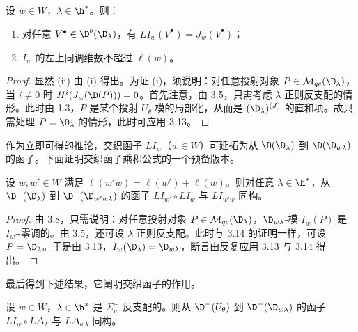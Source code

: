 \begin{theorem}\label{thm:03.3.14}
设 $w\in W$，$\lambda\in\h^*$。则：
\begin{enumerate}[label=(\roman*),leftmargin=2.2em,itemsep=0pt,topsep=2pt]
\item 对任意 $V^\bullet\in\D^b(\D_\lambda)$，有 $LI_w(V^\bullet)=J_w(V^\bullet)$；
\item $I_w$ 的左上同调维数不超过 $\ell(w)$。
\end{enumerate}
\end{theorem}

\begin{proof}
显然 (ii) 由 (i) 得出。为证 (i)，须说明：对任意投射对象 $P\in\mathcal{M}_{qc}(\D_\lambda)$，当 $i\neq0$ 时 $H^i(J_w(\D(P)))=0$。首先注意，由 3.5，只需考虑 $\lambda$ 正则反支配的情形。此时由 1.3，$P$ 是某个投射 $U_\theta$-模的局部化，从而是 $(\D_\lambda)^{(J)}$ 的直和项。故只需处理 $P=\D_\lambda$ 的情形，此时可应用 3.13。
\end{proof}

作为立即可得的推论，交织函子 $LI_w$（$w\in W$）可延拓为从 $\D(\D_\lambda)$ 到 $\D(\D_{w\lambda})$ 的函子。下面证明交织函子乘积公式的一个预备版本。

\begin{lemma}\label{lem:03.3.15}
设 $w,w'\in W$ 满足 $\ell(w'w)=\ell(w')+\ell(w)$。则对任意 $\lambda\in\h^*$，从 $\D^-(\D_\lambda)$ 到 $\D^-(\D_{w'w\lambda})$ 的函子 $LI_{w'}\circ LI_w$ 与 $LI_{w'w}$ 同构。
\end{lemma}

\begin{proof}
由 3.8，只需说明：对任意投射对象 $P\in\mathcal{M}_{qc}(\D_\lambda)$，$\D_{w\lambda}$-模 $I_w(P)$ 是 $I_{w'}$-零调的。由 3.5，还可设 $\lambda$ 正则反支配。此时与 3.14 的证明一样，可设 $P=\D_\lambda$。于是由 3.13，$I_w(\D_\lambda)=\D_{w\lambda}$，断言由反复应用 3.13 与 3.14 得出。
\end{proof}

最后得到下述结果，它阐明交织函子的作用。

\begin{theorem}\label{thm:03.3.16}
设 $w\in W$，$\lambda\in\h^*$ 是 $\Sigma^+_w$-反支配的。则从 $\D^-(U_\theta)$ 到 $\D^-(\D_{w\lambda})$ 的函子 $LI_w\circ L\Delta_\lambda$ 与 $L\Delta_{w\lambda}$ 同构。
\end{theorem}

